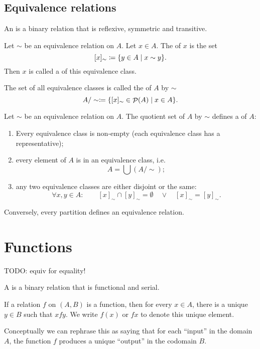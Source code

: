 \subsection{Equivalence relations}
\begin{definition}
An  is a binary relation that is reflexive, symmetric and transitive.
\end{definition}
\begin{definition}
Let $\sim$ be an equivalence relation on $A$. Let $x\in A$. The  of $x$ is the set
\[ [x]_\sim \coloneqq \{ y\in A\;|\; x\sim y \}. \]
Then $x$ is called a  of this equivalence class.

The set of all equivalence classes is called the  of $A$ by $\sim$
\[ A/\sim \coloneqq \{ [x]_\sim \in \mathop{\mathcal{P}}(A) \;|\; x\in A \}. \]
\end{definition}
\begin{proposition}
Let $\sim$ be an equivalence relation on $A$. The quotient set of $A$ by $\sim$ defines a  of $A$:
\begin{enumerate}
\item Every equivalence class is non-empty (each equivalence class has a representative);
\item every element of $A$ is in an equivalence class, i.e.
\[ A = \bigcup (A/\sim); \]
\item any two equivalence classes are either disjoint or the same:
\[ \forall x,y\in A: \qquad[x]_\sim \cap [y]_\sim = \emptyset \quad \lor \quad [x]_\sim = [y]_\sim. \]
\end{enumerate}
Conversely, every partition defines an equivalence relation.
\end{proposition}

\section{Functions}
TODO: equiv for equality!

\begin{definition}
A  is a binary relation that is functional and serial.
\end{definition}
If a relation $f$ on $(A, B)$ is a function, then for every $x\in A$, there is a unique $y\in B$ such that $xfy$. We write $f(x)$ or $fx$ to denote this unique element.

Conceptually we can rephrase this as saying that for each ``input'' in the domain $A$, the function $f$ produces a unique ``output'' in the codomain $B$.

